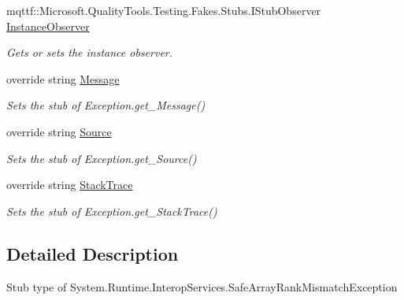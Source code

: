 \begin{DoxyCompactItemize}
mqttf\-::\-Microsoft.\-Quality\-Tools.\-Testing.\-Fakes.\-Stubs.\-I\-Stub\-Observer \hyperlink{class_system_1_1_runtime_1_1_interop_services_1_1_fakes_1_1_stub_safe_array_rank_mismatch_exception_ade4fcea4ee50eaadacb516ce2bc5e16e}{Instance\-Observer}
\begin{DoxyCompactList}\small\item\em Gets or sets the instance observer.\end{DoxyCompactList}\item 
override string \hyperlink{class_system_1_1_runtime_1_1_interop_services_1_1_fakes_1_1_stub_safe_array_rank_mismatch_exception_a32bb17124edcea2fc5edbd4839043351}{Message}
\begin{DoxyCompactList}\small\item\em Sets the stub of Exception.\-get\-\_\-\-Message()\end{DoxyCompactList}\item 
override string \hyperlink{class_system_1_1_runtime_1_1_interop_services_1_1_fakes_1_1_stub_safe_array_rank_mismatch_exception_a479ad9265e642fdffdf542879dfd5e23}{Source}
\begin{DoxyCompactList}\small\item\em Sets the stub of Exception.\-get\-\_\-\-Source()\end{DoxyCompactList}\item 
override string \hyperlink{class_system_1_1_runtime_1_1_interop_services_1_1_fakes_1_1_stub_safe_array_rank_mismatch_exception_a611759702a1f6a2175ea87a0ea25b102}{Stack\-Trace}
\begin{DoxyCompactList}\small\item\em Sets the stub of Exception.\-get\-\_\-\-Stack\-Trace()\end{DoxyCompactList}\end{DoxyCompactItemize}


\subsection{Detailed Description}
Stub type of System.\-Runtime.\-Interop\-Services.\-Safe\-Array\-Rank\-Mismatch\-Exception




